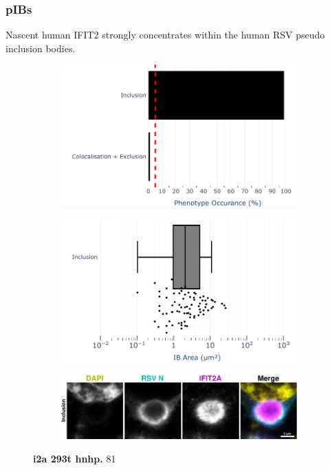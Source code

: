 \subsubsection{pIBs}
Nascent human IFIT2 strongly concentrates within the human RSV pseudo inclusion bodies.

\begin{figure}
    \begin{subfigure}{0.495\textwidth}
        \caption{}
        \includegraphics[width=1\linewidth]{10. Chapter 5/Figs/02. pIB/02. IFIT2A/01. bar_i2a_293t.pdf} 
    \end{subfigure}
    \begin{subfigure}{0.495\textwidth}
        \caption{}
        \includegraphics[width=1\linewidth]{10. Chapter 5/Figs/02. pIB/02. IFIT2A/02. box_i2a_293t.pdf}
    \end{subfigure}
    \begin{subfigure}{1\textwidth}
        \caption{}
        \includegraphics[width=1\linewidth]{10. Chapter 5/Figs/02. pIB/02. IFIT2A/03. i2a-293t-hnhp.pdf} 
    \end{subfigure}
    \caption[i2a 293t hnhp]{\textbf{i2a 293t hnhp.} 81}
    \label{fig:i2a 293t hnhp}
\end{figure}

